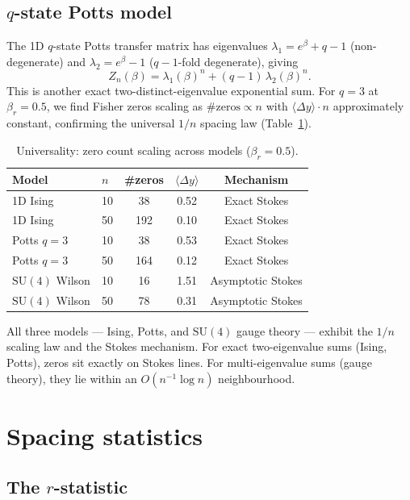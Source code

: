 \documentclass[12pt]{article}
\theoremstyle{definition}
\theoremstyle{remark}
\newcommand{\SU}{\mathrm{SU}}
\newcommand{\avg}[1]{\langle #1 \rangle}
\begin{document}
\subsection{$q$-state Potts model}

The 1D $q$-state Potts transfer matrix has eigenvalues
$\lambda_1 = e^\beta + q - 1$ (non-degenerate) and
$\lambda_2 = e^\beta - 1$ ($q{-}1$-fold degenerate), giving
\[
Z_n(\beta) = \lambda_1(\beta)^n + (q{-}1)\,\lambda_2(\beta)^n.
\]
This is another exact two-distinct-eigenvalue exponential sum.
For $q = 3$ at $\beta_r = 0.5$, we find Fisher zeros scaling as
$\#\text{zeros} \propto n$ with $\avg{\Delta y} \cdot n$
approximately constant, confirming the universal $1/n$ spacing law
(Table~\ref{tab:universality}).

\begin{table}[h]
\centering
\caption{Universality: zero count scaling across models ($\beta_r = 0.5$).}
\label{tab:universality}
\begin{tabular}{llccc}
\toprule
Model & $n$ & \#zeros & $\avg{\Delta y}$ & Mechanism \\
\midrule
1D Ising & 10 & 38 & 0.52 & Exact Stokes \\
1D Ising & 50 & 192 & 0.10 & Exact Stokes \\
\midrule
Potts $q{=}3$ & 10 & 38 & 0.53 & Exact Stokes \\
Potts $q{=}3$ & 50 & 164 & 0.12 & Exact Stokes \\
\midrule
$\SU(4)$ Wilson & 10 & 16 & 1.51 & Asymptotic Stokes \\
$\SU(4)$ Wilson & 50 & 78 & 0.31 & Asymptotic Stokes \\
\bottomrule
\end{tabular}
\end{table}

All three models --- Ising, Potts, and $\SU(4)$ gauge theory ---
exhibit the $1/n$ scaling law and the Stokes mechanism.  For exact
two-eigenvalue sums (Ising, Potts), zeros sit exactly on Stokes lines.
For multi-eigenvalue sums (gauge theory), they lie within an
$O(n^{-1}\log n)$ neighbourhood.


\section{Spacing statistics}
\label{sec:statistics}

\subsection{The $r$-statistic}
\end{document}
